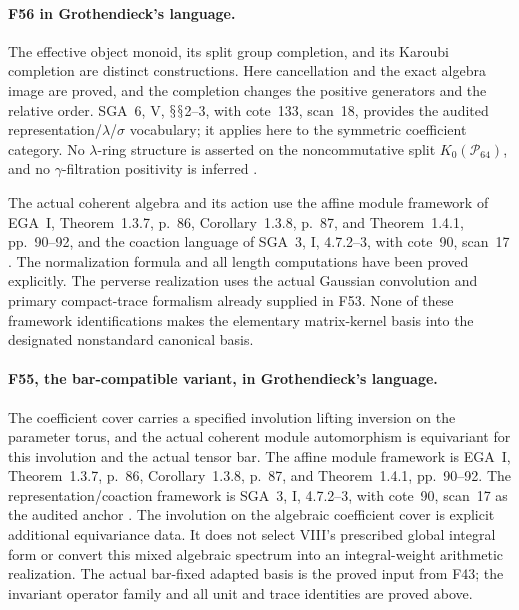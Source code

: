 \documentclass[11pt,a4paper]{article}
\renewcommand{\S}{\ensuremath{\mathsection}}
\newcommand{\fid}[1]{\textsf{#1}}\newcommand{\gate}[1]{\textsf{#1}}
\theoremstyle{named}\newtheorem{finding}{Finding}[section]
\theoremstyle{definition}\newtheorem{definition}[finding]{Definition}
\theoremstyle{remark}\newtheorem{remark}[finding]{Remark}
\begin{document}
\paragraph{\fid{F56} in Grothendieck's language.}
The effective object monoid, its split group completion,
and its Karoubi completion are distinct constructions.
Here cancellation and the exact algebra image are proved,
and the completion changes the positive generators and
the relative order.
SGA~6, V, \S\S2--3, with cote~133, scan~18, provides the
audited representation/$\lambda$/$\sigma$ vocabulary;
it applies here to the symmetric coefficient category.
No $\lambda$-ring structure is asserted on the
noncommutative split $K_0(\mathcal P_{64})$, and
no $\gamma$-filtration positivity is inferred
\cite{SGA6,Archive}.

The actual coherent algebra and its action use the
affine module framework of EGA~I, Theorem~1.3.7, p.~86,
Corollary~1.3.8, p.~87, and Theorem~1.4.1, pp.~90--92,
and the coaction language of SGA~3, I, 4.7.2--3,
with cote~90, scan~17 \cite{EGA,SGA3,Archive}.
The normalization formula and all length computations
have been proved explicitly.
The perverse realization uses the actual Gaussian
convolution and primary compact-trace formalism
already supplied in \fid{F53}.
None of these framework identifications makes the
elementary matrix-kernel basis into the designated
nonstandard canonical basis.

\paragraph{\fid{F55}, the bar-compatible variant, in Grothendieck's language.}
The coefficient cover carries a specified involution
lifting inversion on the parameter torus, and the actual
coherent module automorphism is equivariant for this
involution and the actual tensor bar.
The affine module framework is EGA~I, Theorem~1.3.7,
p.~86, Corollary~1.3.8, p.~87, and Theorem~1.4.1,
pp.~90--92.
The representation/coaction framework is SGA~3, I,
4.7.2--3, with cote~90, scan~17 as the audited anchor
\cite{EGA,SGA3,Archive}.
The involution on the algebraic coefficient cover is
explicit additional equivariance data.
It does not select VIII's prescribed global integral
form or convert this mixed algebraic spectrum into
an integral-weight arithmetic realization.
The actual bar-fixed adapted basis is the proved
input from \fid{F43}; the invariant operator family
and all unit and trace identities are proved above.
\end{document}
